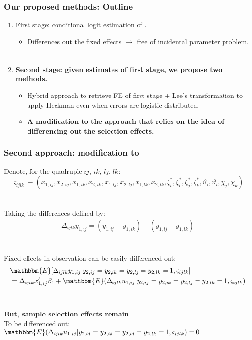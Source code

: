 \begin{frame}
    \frametitle{Our proposed methods: Outline}
    \begin{enumerate}
        \item First stage: conditional logit estimation of \cite{charbonneau2017multiple}.
        \begin{itemize}
            \item Differences out the fixed effects $\xrightarrow[]{}$ free of incidental parameter problem.\\~\\ 
        \end{itemize}
        \item \textbf{Second stage: given estimates of first stage, we propose two methods.}
        \begin{itemize}
            \item Hybrid approach to retrieve FE of first stage + Lee's transformation to apply Heckman even when errors are logistic distributed.
            \item \textbf{A modification to the \cite{kyriazidou1997estimation} approach that relies on the idea of differencing out the selection effects.}
        \end{itemize}
    \end{enumerate}
\end{frame}

\begin{frame}
    \frametitle{Second approach: modification to \cite{kyriazidou1997estimation}}
Denote, for the quadruple $ij$, $ik$, $lj$, $lk$: 
$$\varsigma_{ijlk} \equiv (x_{1,ij}, x_{2,ij}, x_{1,ik}, x_{2,ik}, x_{1,lj}, x_{2,lj}, x_{1,lk}, x_{2,lk},\xi_i^*, \xi_l^*,\zeta_j^*, \zeta_k^*, \vartheta_i, \vartheta_l, \chi_j, \chi_k)$$ 
\\~\\
Taking the differences defined by:
\begin{align*}
    \Delta_{ijlk} y_{1,ij} = (y_{1,ij} - y_{1,ik}) - (y_{1,lj} - y_{1,lk}) 
\end{align*}
\\~\\ \pause
Fixed effects in observation can be easily differenced out:
\begin{align*}
    &\mathbbm{E}[\Delta_{ijlk} y_{1,ij} \rvert y_{2,ij} = y_{2,ik} = y_{2,lj} = y_{2,lk} =1, \varsigma_{ijlk}] \\
    &= \Delta_{ijlk} x_{1,ij}' \beta_1 + \mathbbm{E}(\Delta_{ijlk} u_{1,ij} \rvert y_{2,ij} = y_{2,ik} = y_{2,lj} = y_{2,lk} =1, \varsigma_{ijlk})
\end{align*} \\~\\ \pause
\textbf{But, sample selection effects remain.} \\
To be differenced out: $\mathbbm{E}(\Delta_{ijlk} u_{1,ij} \rvert y_{2,ij} = y_{2,ik} = y_{2,lj} = y_{2,lk} =1, \varsigma_{ijlk}) = 0$

\end{frame}

